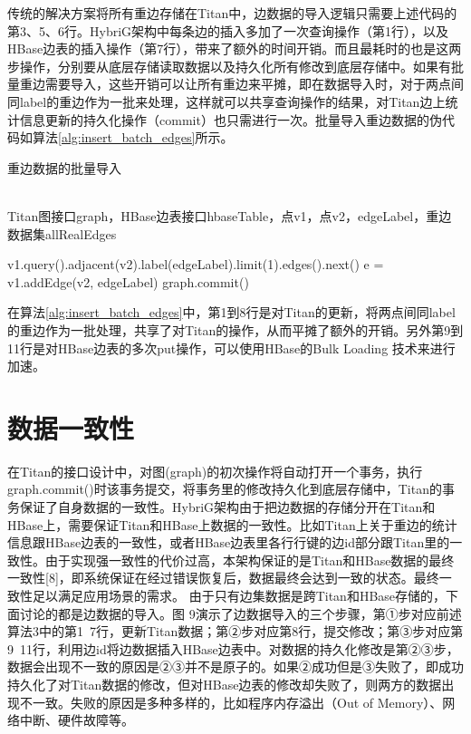 传统的解决方案将所有重边存储在Titan中，边数据的导入逻辑只需要上述代码的第3、5、6行。HybriG架构中每条边的插入多加了一次查询操作（第1行），以及HBase边表的插入操作（第7行），带来了额外的时间开销。而且最耗时的也是这两步操作，分别要从底层存储读取数据以及持久化所有修改到底层存储中。如果有批量重边需要导入，这些开销可以让所有重边来平摊，即在数据导入时，对于两点间同label的重边作为一批来处理，这样就可以共享查询操作的结果，对Titan边上统计信息更新的持久化操作（commit）也只需进行一次。批量导入重边数据的伪代码如算法\ref{alg:insert_batch_edges}所示。
\begin{algorithm}
\caption{重边数据的批量导入}
\label{alg:insert_batch_edges}
\begin{algorithmic}[1] %
\REQUIRE ~~\\
Titan图接口graph，HBase边表接口hbaseTable，点v1，点v2，edgeLabel，重边数据集allRealEdges

\STATE v1.query().adjacent(v2).label(edgeLabel).limit(1).edges().next()
\STATE e = v1.addEdge(v2, edgeLabel)
\ENDIF
{}
\ENDFOR
\STATE graph.commit()
\ENDFOR
\end{algorithmic} 
\end{algorithm}

在算法\ref{alg:insert_batch_edges}中，第1到8行是对Titan的更新，将两点间同label的重边作为一批处理，共享了对Titan的操作，从而平摊了额外的开销。另外第9到11行是对HBase边表的多次put操作，可以使用HBase的Bulk Loading 技术来进行加速。

\section{数据一致性}
在Titan的接口设计中，对图(graph)的初次操作将自动打开一个事务，执行graph.commit()时该事务提交，将事务里的修改持久化到底层存储中，Titan的事务保证了自身数据的一致性。HybriG架构由于把边数据的存储分开在Titan和HBase上，需要保证Titan和HBase上数据的一致性。比如Titan上关于重边的统计信息跟HBase边表的一致性，或者HBase边表里各行行键的边id部分跟Titan里的一致性。由于实现强一致性的代价过高，本架构保证的是Titan和HBase数据的最终一致性[8]，即系统保证在经过错误恢复后，数据最终会达到一致的状态。最终一致性足以满足应用场景的需求。
由于只有边集数据是跨Titan和HBase存储的，下面讨论的都是边数据的导入。图 9演示了边数据导入的三个步骤，第①步对应前述算法3中的第1~7行，更新Titan数据；第②步对应第8行，提交修改；第③步对应第9~11行，利用边id将边数据插入HBase边表中。对数据的持久化修改是第②③步，数据会出现不一致的原因是②③并不是原子的。如果②成功但是③失败了，即成功持久化了对Titan数据的修改，但对HBase边表的修改却失败了，则两方的数据出现不一致。失败的原因是多种多样的，比如程序内存溢出（Out of Memory）、网络中断、硬件故障等。
 

